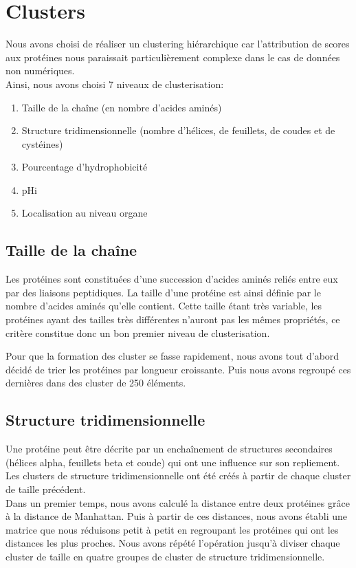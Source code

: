 \section*{Clusters}
Nous avons choisi de réaliser un clustering hiérarchique car l'attribution de scores aux protéines nous paraissait particulièrement complexe dans le cas de données non numériques.\\%
Ainsi, nous avons choisi 7 niveaux de clusterisation:
\begin{enumerate}
\item Taille de la chaîne (en nombre d'acides aminés)
\item Structure tridimensionnelle (nombre d'hélices, de feuillets, de coudes et de cystéines)
\item Pourcentage d'hydrophobicité
\item pHi
\item Localisation au niveau organe
\end{enumerate}


\subsection*{Taille de la chaîne}
Les protéines sont constituées d'une succession d'acides aminés reliés entre eux par des liaisons peptidiques. La taille d'une protéine est ainsi définie par le nombre d'acides aminés qu'elle contient. Cette taille étant très variable, les protéines ayant des tailles très différentes n'auront pas les m\^emes propriétés, ce critère constitue donc un bon premier niveau de clusterisation.

Pour que la formation des cluster se fasse rapidement, nous avons tout d'abord décidé de trier les protéines par longueur croissante. Puis nous avons regroupé ces dernières dans des cluster de 250 éléments.

\subsection*{Structure tridimensionnelle}
Une protéine peut être décrite par un enchaînement de structures secondaires (hélices alpha, feuillets beta et coude) qui ont une influence sur son repliement.\\
Les clusters de structure tridimensionnelle ont été créés à partir de chaque cluster de taille précédent.\\
Dans un premier temps, nous avons calculé la distance entre deux protéines gr\^ace à la distance de Manhattan.
Puis à partir de ces distances, nous avons établi une matrice que nous réduisons petit à petit en regroupant les protéines qui ont les distances les plus proches. Nous avons répété l'opération jusqu'à diviser chaque cluster de taille en quatre groupes de cluster de structure tridimensionnelle.

